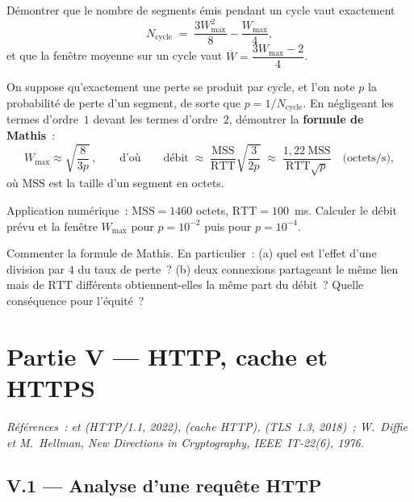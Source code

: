 \documentclass[11pt,a4paper]{article}
\begin{document}
\Q Démontrer que le nombre de segments émis pendant un cycle vaut exactement
\[ N_{\text{cycle}} \;=\; \frac{3W_{\max}^{2}}{8}-\frac{W_{\max}}{4}, \]
et que la fenêtre moyenne sur un cycle vaut $\overline{W}=\dfrac{3W_{\max}-2}{4}$.

\Q On suppose qu'exactement une perte se produit par cycle, et l'on note $p$ la probabilité
de perte d'un segment, de sorte que $p=1/N_{\text{cycle}}$. En négligeant les termes
d'ordre~$1$ devant les termes d'ordre~$2$, démontrer la \textbf{formule de Mathis}~:
\[ W_{\max}\approx\sqrt{\frac{8}{3p}}\,,\qquad\text{d'où}\qquad
   \text{débit}\;\approx\;\frac{\mathrm{MSS}}{\mathrm{RTT}}\sqrt{\frac{3}{2p}}
   \;\approx\;\frac{1{,}22\ \mathrm{MSS}}{\mathrm{RTT}\sqrt{p}}\quad\text{(octets/s)}, \]
où $\mathrm{MSS}$ est la taille d'un segment en octets.

\Q Application numérique~: $\mathrm{MSS}=1460$ octets, $\mathrm{RTT}=100$~ms. Calculer le
débit prévu et la fenêtre $W_{\max}$ pour $p=10^{-2}$ puis pour $p=10^{-4}$.

\Q Commenter la formule de Mathis. En particulier~: (a) quel est l'effet d'une division par
$4$ du taux de perte~? (b) deux connexions partageant le même lien mais de $\mathrm{RTT}$
différents obtiennent-elles la même part du débit~? Quelle conséquence pour l'équité~?

\section*{Partie V --- HTTP, cache et HTTPS}

\emph{Références~:  et  (HTTP/1.1, 2022),  (cache HTTP),
 (TLS~1.3, 2018)~; W.~Diffie et M.~Hellman, \emph{New Directions in Cryptography},
IEEE~IT-22(6), 1976.}

\subsection*{V.1 --- Analyse d'une requête HTTP}
\end{document}
